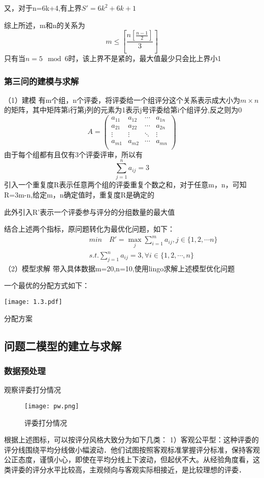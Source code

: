 \documentclass{my_paper}
\begin{document}
	又，对于n=6k+4,有上界$S'=6k^2+6k+1$
	
	综上所述，m和n的关系为
	$$m \leq [\frac{n [ \frac{n-1}{2} ]}{3}]$$
	只有当$n=5 \mod 6$时，该上界不是紧的，最大值最少只会比上界小1
	
	\subsubsection{第三问的建模与求解}
	（1）建模
	有m个组，n个评委，将评委给一个组评分这个关系表示成大小为$m \times n$的矩阵，其中矩阵第i行第j列的元素为1表示j号评委给第i个组评分,反之则为0
	$$
	A=\begin{pmatrix}
		a_{11} & a_{12} & \cdots & a_{1n} \\
		a_{21} & a_{22} & \cdots & a_{2n} \\
		\vdots & \vdots & \ddots & \vdots \\
		a_{m1} & a_{m2} & \cdots & a_{mn} \\
	\end{pmatrix}
	$$
	由于每个组都有且仅有3个评委评审，所以有
	$$\sum_{j=1}^{n}a_{ij}=3$$
	引入一个重复度R表示任意两个组的评委重复个数之和，对于任意m，n，可知R=3m-n,给定m，n确定值时，重复度R是确定的
	
	此外引入R'表示一个评委参与评分的分组数量的最大值
	
	结合上述两个指标，原问题转化为最优化问题，如下：
	\begin{align*}
		\quad \quad \qquad \qquad &min \quad R'=\max_{j} \sum_{i=1}^{m} a_{ij},j \in \{1,2,\cdots n\} &\\
		&s.t.    \sum_{j=1}^{n}a_{ij}=3,\forall i \in \{1,2,\cdots,n\} & 
	\end{align*}
	（2）模型求解
	带入具体数据m=20,n=10,使用lingo求解上述模型优化问题
	
	一个最优的分配方式如下：
	
	\begin{table}[htbp]
		\centering
		\texttt{[image: 1.3.pdf]}
		\caption{分配方案}
	\end{table}
	
	\newpage
	\subsection{问题二模型的建立与求解}
	\subsubsection{数据预处理}
	观察评委打分情况
	\begin{figure}[htbp]
		\centering
		\texttt{[image: pw.png]}
		\caption{评委打分情况}
	\end{figure}
	根据上述图标，可以按评分风格大致分为如下几类：
	1）客观公平型：这种评委的评分线围绕平均分线做小幅波动．他们试图按照客观标准掌握评分标准，保持客观公正态度，谨慎小心，即使在平均分线上下波动，但起伏不大。从经验角度看，这类评委的评分水平比较高，主观倾向与客观实际相接近，是比较理想的评委．
	
\end{document}
